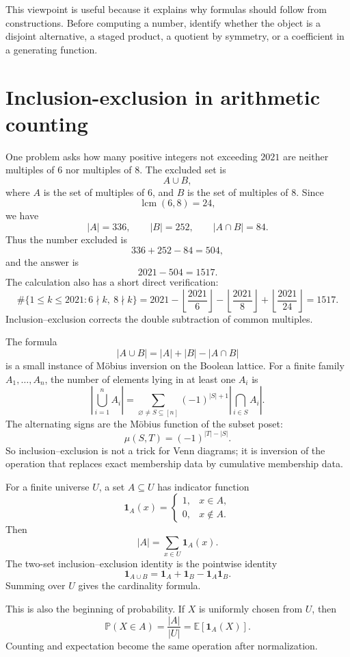 This viewpoint is useful because it explains why formulas should follow from constructions.  Before computing a number, identify whether the object is a disjoint alternative, a staged product, a quotient by symmetry, or a coefficient in a generating function.

\section{Inclusion-exclusion in arithmetic counting}

One problem asks how many positive integers not exceeding \(2021\) are neither multiples of \(6\) nor multiples of \(8\).  The excluded set is
\[
  A\cup B,
\]
where \(A\) is the set of multiples of \(6\), and \(B\) is the set of multiples of \(8\).  Since
\[
  \operatorname{lcm}(6,8)=24,
\]
we have
\[
  |A|=336,\qquad |B|=252,\qquad |A\cap B|=84.
\]
Thus the number excluded is
\[
  336+252-84=504,
\]
and the answer is
\[
  2021-504=1517.
\]
The calculation also has a short direct verification:
\[
 \#\{1\le k\le2021:6\nmid k,\ 8\nmid k\}
 =2021-\left\lfloor\frac{2021}{6}\right\rfloor
       -\left\lfloor\frac{2021}{8}\right\rfloor
       +\left\lfloor\frac{2021}{24}\right\rfloor=1517.
\]
Inclusion--exclusion corrects the double subtraction of common multiples.

The formula
\[
  |A\cup B|=|A|+|B|-|A\cap B|
\]
is a small instance of Möbius inversion on the Boolean lattice.  For a finite family \(A_1,\ldots,A_n\), the number of elements lying in at least one \(A_i\) is
\[
  \left|\bigcup_{i=1}^n A_i\right|
  =\sum_{\varnothing\ne S\subseteq[n]}(-1)^{|S|+1}
  \left|\bigcap_{i\in S}A_i\right|.
\]
The alternating signs are the Möbius function of the subset poset:
\[
  \mu(S,T)=(-1)^{|T|-|S|}.
\]
So inclusion--exclusion is not a trick for Venn diagrams; it is inversion of the operation that replaces exact membership data by cumulative membership data.

For a finite universe \(U\), a set \(A\subseteq U\) has indicator function
\[
  \mathbf 1_A(x)=
  \begin{cases}
  1,&x\in A,\\
  0,&x\notin A.
  \end{cases}
\]
Then
\[
  |A|=\sum_{x\in U}\mathbf 1_A(x).
\]
The two-set inclusion--exclusion identity is the pointwise identity
\[
  \mathbf 1_{A\cup B}=\mathbf 1_A+\mathbf 1_B-\mathbf 1_A\mathbf 1_B.
\]
Summing over \(U\) gives the cardinality formula.

This is also the beginning of probability.  If \(X\) is uniformly chosen from \(U\), then
\[
  \mathbb P(X\in A)=\frac{|A|}{|U|}=\mathbb E[\mathbf 1_A(X)].
\]
Counting and expectation become the same operation after normalization.

